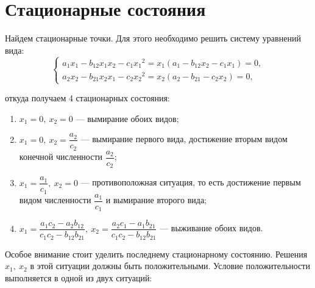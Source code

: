 \documentclass[12pt,a4paper]{article}
\begin{document}
    \section{Стационарные состояния}

    Найдем стационарные точки. Для этого необходимо решить систему уравнений вида: 
    \begin{equation}
        \label{seps}
        \begin{cases}
            a_1 x_1 - b_{12} x_1 x_2 - c_1 {x_1}\!^2 = x_1 (a_1 - b_{12} x_2 - c_1 x_1) = 0,
            \\
            a_2 x_2 - b_{21} x_2 x_1 - c_2 {x_2}\!^2 = x_2 (a_2 - b_{21} - c_2 x_2) = 0,
        \end{cases}
    \end{equation}
    \pagebreak
    
    \noindent откуда получаем 4 стационарных состояния:
    \begin{enumerate}
        \setlength\itemsep{0.5em}
        \item $ x_1 = 0,\ x_2 = 0 $ --- вымирание обоих видов;
        \item $ x_1 = 0,\ x_2 = \dfrac{a_2}{c_2} $ --- вымирание первого вида, достижение вторым видом конечной численности $ \dfrac{a_2}{c_2} $;
        \item $ x_1 = \dfrac{a_1}{c_1},\ x_2 = 0 $ --- противоположная ситуация, то есть достижение первым видом численности $ \dfrac{a_1}{c_1} $ и вымирание второго вида;
        \item $ x_1 = \dfrac{a_1 c_2 - a_2 b_{12}}{c_1 c_2 - b_{12} b_{21}},\ x_2 = \dfrac{a_2 c_1 - a_1 b_{21}}{c_1 c_2 - b_{12} b_{21}}$ --- выживание обоих видов.
    \end{enumerate} 

    \vspace{1em}Особое внимание стоит уделить последнему стационарному состоянию. Решения $ x_1,\ x_2 $ в этой ситуации должны быть положительными. Условие положительности выполняется в одной из двух ситуаций: 
\end{document}
